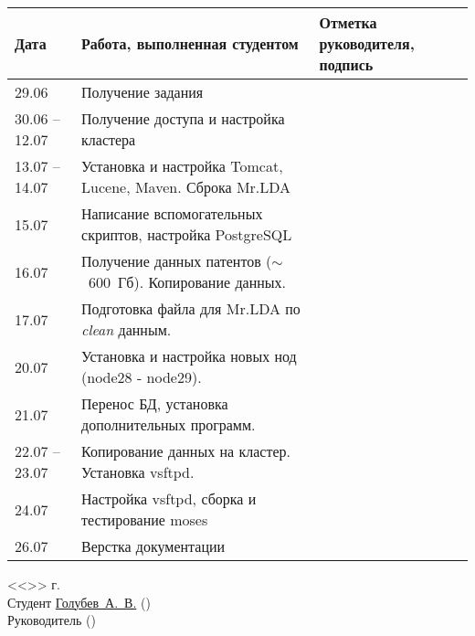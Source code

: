 \begin{table}[h!]
    \centering
    \begin{tabular}{|m{}|m{}|m{}|}
        \hline
        Дата & Работа, выполненная студентом & Отметка
        руководителя, подпись \\ \hline
        29.06          & Получение задания & \\ \hline
        30.06 -- 12.07 & Получение доступа и настройка кластера & \\ \hline
        13.07 -- 14.07 & Установка и настройка Tomcat, Lucene, Maven. Сброка Mr.LDA & \\ \hline
        15.07          & Написание вспомогательных скриптов, настройка PostgreSQL & \\ \hline
        16.07          & Получение данных патентов (\( \sim \)~600~Гб). Копирование данных. & \\ \hline
        17.07          & Подготовка файла для Mr.LDA по \emph{clean} данным. & \\ \hline
        20.07          & Установка и настройка новых нод (node28 - node29). & \\ \hline
        21.07          & Перенос БД, установка дополнительных программ. & \\ \hline
        22.07 -- 23.07 & Копирование данных на кластер. Установка vsftpd. & \\ \hline
        24.07          & Настройка vsftpd, сборка и тестирование moses & \\ \hline
        26.07          & Верстка документации & \\ \hline
    \end{tabular}
\end{table}
\pagestyle{empty}
\vspace{\fill}
\noindent<<\underline{\hspace{1cm}}>> \underline{\hspace{5cm}} \the\year г.\\
Студент \hspace{1cm} \underline{Голубев~А.~В.\hspace{3.2cm}} \hspace{2cm} (\underline{\hspace{5cm}})\\
Руководитель \underline{\hspace{6.1cm}} \hspace{2cm} (\underline{\hspace{5cm}})\\